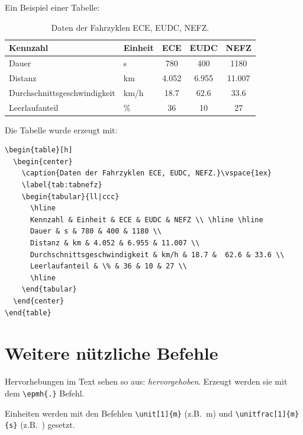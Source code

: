 Ein Beispiel einer Tabelle:
\begin{table}[h]
  \begin{center}
    \caption{Daten der Fahrzyklen ECE, EUDC, NEFZ.}\vspace{1ex}
    \label{tab:tabnefz}
    \begin{tabular}{ll|ccc}
      \hline
      Kennzahl & Einheit & ECE & EUDC & NEFZ \\ \hline \hline
      Dauer & s & 780 & 400 & 1180 \\
      Distanz & km & 4.052 & 6.955 & 11.007 \\
      Durchschnittsgeschwindigkeit & km/h & 18.7 &  62.6 & 33.6 \\
      Leerlaufanteil & \% & 36 & 10 & 27 \\
      \hline
    \end{tabular}
  \end{center}
\end{table}

Die Tabelle wurde erzeugt mit:
\begin{verbatim}
\begin{table}[h]
  \begin{center}
    \caption{Daten der Fahrzyklen ECE, EUDC, NEFZ.}\vspace{1ex}
    \label{tab:tabnefz}
    \begin{tabular}{ll|ccc}
      \hline
      Kennzahl & Einheit & ECE & EUDC & NEFZ \\ \hline \hline
      Dauer & s & 780 & 400 & 1180 \\
      Distanz & km & 4.052 & 6.955 & 11.007 \\
      Durchschnittsgeschwindigkeit & km/h & 18.7 &  62.6 & 33.6 \\
      Leerlaufanteil & \% & 36 & 10 & 27 \\
      \hline
    \end{tabular}
  \end{center}
\end{table}
\end{verbatim}

\section{Weitere nützliche Befehle}\label{sec:div}

Hervorhebungen im Text sehen so aus: \emph{hervorgehoben}. Erzeugt
werden sie mit dem \texttt{\textbackslash epmh\{.\}} Befehl.

Einheiten werden mit den Befehlen \texttt{\textbackslash unit[1]\{m\}}
(z.B.~\unit[1]{m}) und \texttt{\textbackslash unitfrac[1]\{m\}\{s\}}
(z.B.~) gesetzt.
